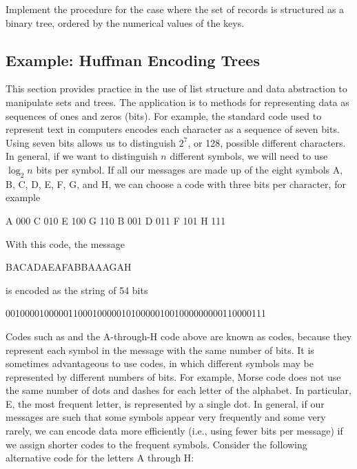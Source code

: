 \begin{exerciseGroup}
\label{Exercise 2.66}
 Implement the 
procedure for the case where the set of records is structured as a binary tree,
ordered by the numerical values of the keys.
\end{exerciseGroup}

\subsection{Example: Huffman Encoding Trees}
\label{Section 2.3.4}

This section provides practice in the use of list structure and data
abstraction to manipulate sets and trees.  The application is to methods for
representing data as sequences of ones and zeros (bits).  For example, the
 standard code used to represent text in computers encodes each character
as a sequence of seven bits.  Using seven bits allows us to distinguish \( 2^7 \),
or 128, possible different characters.  In general, if we want to distinguish
\( n \) different symbols, we will need to use \( \log_2\!n \) bits per
symbol.  If all our messages are made up of the eight symbols A, B, C, D, E, F,
G, and H, we can choose a code with three bits per character, for example

\begin{example}
A 000    C 010    E 100    G 110
B 001    D 011    F 101    H 111
\end{example}

\noindent
With this code, the message

\begin{example}
BACADAEAFABBAAAGAH
\end{example}

\noindent
is encoded as the string of 54 bits

\begin{example}
001000010000011000100000101000001001000000000110000111
\end{example}

\noindent
Codes such as  and the A-through-H code above are known as
 codes, because they represent each symbol in the message
with the same number of bits.  It is sometimes advantageous to use
 codes, in which different symbols may be represented
by different numbers of bits.  For example, Morse code does not use the same
number of dots and dashes for each letter of the alphabet.  In particular, E,
the most frequent letter, is represented by a single dot.  In general, if our
messages are such that some symbols appear very frequently and some very
rarely, we can encode data more efficiently (i.e., using fewer bits per
message) if we assign shorter codes to the frequent symbols.  Consider the
following alternative code for the letters A through H:

